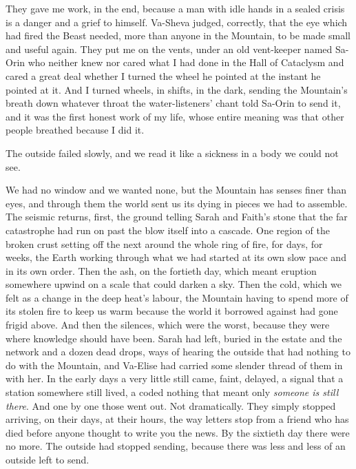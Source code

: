 They gave me work, in the end, because a man with idle hands in a sealed crisis is a danger and a grief to himself. Va-Sheva judged, correctly, that the eye which had fired the Beast needed, more than anyone in the Mountain, to be made small and useful again. They put me on the vents, under an old vent-keeper named Sa-Orin who neither knew nor cared what I had done in the Hall of Cataclysm and cared a great deal whether I turned the wheel he pointed at the instant he pointed at it. And I turned wheels, in shifts, in the dark, sending the Mountain's breath down whatever throat the water-listeners' chant told Sa-Orin to send it, and it was the first honest work of my life, whose entire meaning was that other people breathed because I did it.\par

\ornament

The outside failed slowly, and we read it like a sickness in a body we could not see.\par

We had no window and we wanted none, but the Mountain has senses finer than eyes, and through them the world sent us its dying in pieces we had to assemble. The seismic returns, first, the ground telling Sarah and Faith's stone that the far catastrophe had run on past the blow itself into a cascade. One region of the broken crust setting off the next around the whole ring of fire, for days, for weeks, the Earth working through what we had started at its own slow pace and in its own order. Then the ash, on the fortieth day, which meant eruption somewhere upwind on a scale that could darken a sky. Then the cold, which we felt as a change in the deep heat's labour, the Mountain having to spend more of its stolen fire to keep us warm because the world it borrowed against had gone frigid above. And then the silences, which were the worst, because they were where knowledge should have been. Sarah had left, buried in the estate and the network and a dozen dead drops, ways of hearing the outside that had nothing to do with the Mountain, and Va-Elise had carried some slender thread of them in with her. In the early days a very little still came, faint, delayed, a signal that a station somewhere still lived, a coded nothing that meant only \emph{someone is still there}. And one by one those went out. Not dramatically. They simply stopped arriving, on their days, at their hours, the way letters stop from a friend who has died before anyone thought to write you the news. By the sixtieth day there were no more. The outside had stopped sending, because there was less and less of an outside left to send.\par

